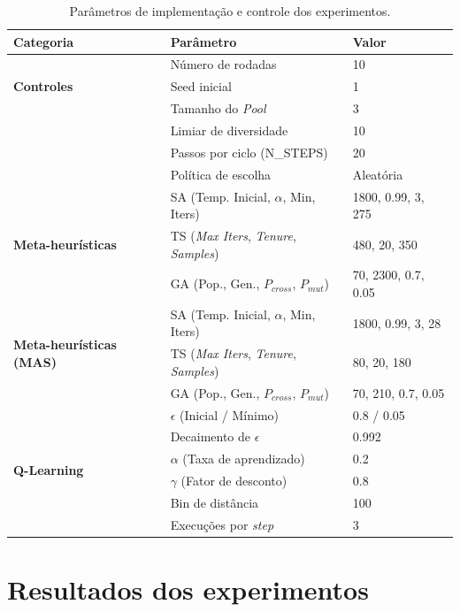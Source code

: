 \begin{table}[h]
\centering
\caption[\small{Parâmetros de implementação dos experimentos.}] {\label{tab:parametros} \small{Parâmetros de implementação e controle dos experimentos.}}
\footnotesize
\begin{tabular}{lll}
\toprule
\textbf{Categoria} & \textbf{Parâmetro} & \textbf{Valor} \\
\midrule
\multirow{3}{*}{\textbf{Controles}} & Número de rodadas & 10 \\
& Seed inicial & 1 \\
\midrule
\multirow{4}{*}{\textbf{MAS}} & Tamanho do \textit{Pool} & 3 \\
& Limiar de diversidade & 10 \\
& Passos por ciclo (N\_STEPS) & 20 \\
& Política de escolha & Aleatória \\
\midrule
\multirow{3}{*}{\textbf{Meta-heurísticas}} & SA (Temp. Inicial, $\alpha$, Min, Iters) & 1800, 0.99, 3, 275 \\
& TS (\textit{Max Iters}, \textit{Tenure}, \textit{Samples}) & 480, 20, 350 \\
& GA (Pop., Gen., $P_{cross}$, $P_{mut}$) & 70, 2300, 0.7, 0.05 \\
\midrule
\multirow{3}{*}{\textbf{Meta-heurísticas (MAS)}} & SA (Temp. Inicial, $\alpha$, Min, Iters) & 1800, 0.99, 3, 28 \\
& TS (\textit{Max Iters}, \textit{Tenure}, \textit{Samples}) & 80, 20, 180 \\
& GA (Pop., Gen., $P_{cross}$, $P_{mut}$) & 70, 210, 0.7, 0.05 \\
\midrule
\multirow{6}{*}{\textbf{Q-Learning}} & $\epsilon$ (Inicial / Mínimo) & 0.8 / 0.05 \\
& Decaimento de $\epsilon$ & 0.992 \\
& $\alpha$ (Taxa de aprendizado) & 0.2 \\
& $\gamma$ (Fator de desconto) & 0.8 \\
& Bin de distância & 100 \\
& Execuções por \textit{step} & 3 \\
\bottomrule
\end{tabular}
\end{table}

\section{Resultados dos experimentos}
\label{sec:resultados}

